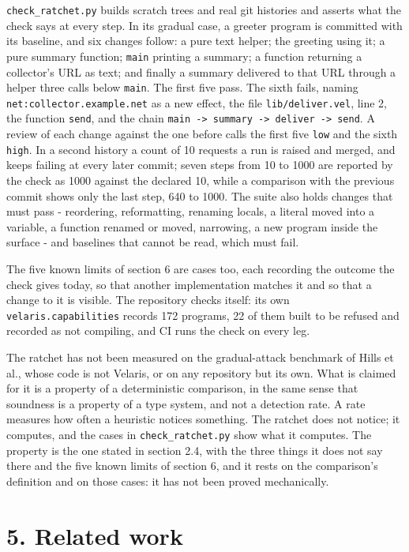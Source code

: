 \documentclass[
]{article}
\begin{document}
\texttt{check\_ratchet.py} builds scratch trees and real git histories
and asserts what the check says at every step. In its gradual case, a
greeter program is committed with its baseline, and six changes follow:
a pure text helper; the greeting using it; a pure summary function;
\texttt{main} printing a summary; a function returning a collector's URL
as text; and finally a summary delivered to that URL through a helper
three calls below \texttt{main}. The first five pass. The sixth fails,
naming \texttt{net:collector.example.net} as a new effect, the file
\texttt{lib/deliver.vel}, line 2, the function \texttt{send}, and the
chain
\texttt{main\ -\textgreater{}\ summary\ -\textgreater{}\ deliver\ -\textgreater{}\ send}.
A review of each change against the one before calls the first five
\texttt{low} and the sixth \texttt{high}. In a second history a count of
10 requests a run is raised and merged, and keeps failing at every later
commit; seven steps from 10 to 1000 are reported by the check as 1000
against the declared 10, while a comparison with the previous commit
shows only the last step, 640 to 1000. The suite also holds changes that
must pass - reordering, reformatting, renaming locals, a literal moved
into a variable, a function renamed or moved, narrowing, a new program
inside the surface - and baselines that cannot be read, which must fail.

The five known limits of section 6 are cases too, each recording the
outcome the check gives today, so that another implementation matches it
and so that a change to it is visible. The repository checks itself: its
own \texttt{velaris.capabilities} records 172 programs, 22 of them built
to be refused and recorded as not compiling, and CI runs the check on
every leg.

The ratchet has not been measured on the gradual-attack benchmark of
Hills et al., whose code is not Velaris, or on any repository but its
own. What is claimed for it is a property of a deterministic comparison,
in the same sense that soundness is a property of a type system, and not
a detection rate. A rate measures how often a heuristic notices
something. The ratchet does not notice; it computes, and the cases in
\texttt{check\_ratchet.py} show what it computes. The property is the
one stated in section 2.4, with the three things it does not say there
and the five known limits of section 6, and it rests on the comparison's
definition and on those cases: it has not been proved mechanically.

\section{5. Related work}\label{related-work}
\end{document}

